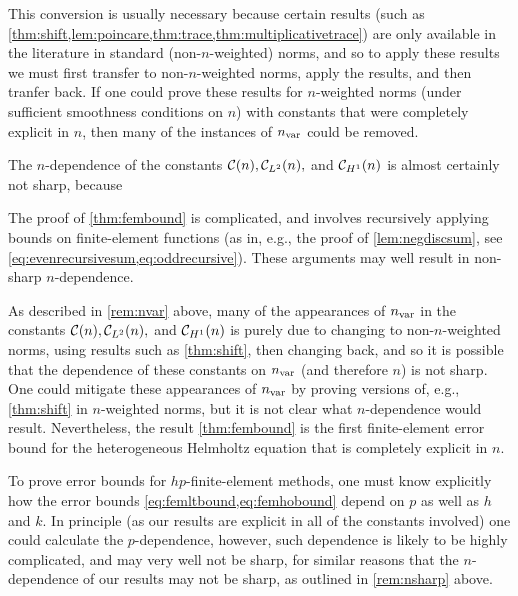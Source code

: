 This conversion is usually necessary because certain results (such as \cref{thm:shift,lem:poincare,thm:trace,thm:multiplicativetrace}) are only available in the literature in standard (non-$n$-weighted) norms, and so to apply these results we must first transfer to non-$n$-weighted norms, apply the results, and then tranfer back. If one could prove these results for $n$-weighted norms (under sufficient smoothness conditions on $n$) with constants that were completely explicit in $n$, then many of the instances of $n_{\mathrm{var}}$ could be removed.
\ere

\label{rem:nsharp}
The $n$-dependence of the constants $\mathcal C(n), \mathcal C_{L^{2}}(n),$ and $\mathcal C_{H^{1}}(n)$ is almost certainly not sharp, because
\ben
\item The proof of \cref{thm:fembound} is complicated, and involves recursively applying bounds on finite-element functions (as in, e.g., the proof of \cref{lem:negdiscsum}, see \cref{eq:evenrecursivesum,eq:oddrecursive}). These arguments may well result in non-sharp $n$-dependence.
  \item As described in \cref{rem:nvar} above, many of the appearances of $n_{\mathrm{var}}$ in the constants $\mathcal C(n), \mathcal C_{L^{2}}(n),$ and $\mathcal C_{H^{1}}(n)$ is purely due to changing to non-$n$-weighted norms, using results such as \cref{thm:shift}, then changing back, and so it is possible that the dependence of these constants on $n_{\mathrm{var}}$ (and therefore $n$) is not sharp. One could mitigate these appearances of $n_{\mathrm{var}}$ by proving versions of, e.g., \cref{thm:shift} in $n$-weighted norms, but it is not clear what $n$-dependence would result.
    \een
Nevertheless, the result \cref{thm:fembound} is the first finite-element error bound for the heterogeneous Helmholtz equation that is completely explicit in $n.$
\ere

\bre[$p$-dependence]
To prove error bounds for $hp$-finite-element methods, one must know explicitly how the error bounds \cref{eq:femltbound,eq:femhobound} depend on $p$ as well as $h$ and $k$. 
In principle (as our results are explicit in all of the constants involved) one could calculate the $p$-dependence, however, such dependence is likely to be highly complicated, and may very well not be sharp, for similar reasons that the $n$-dependence of our results may not be sharp, as outlined in \cref{rem:nsharp} above.
\ere

